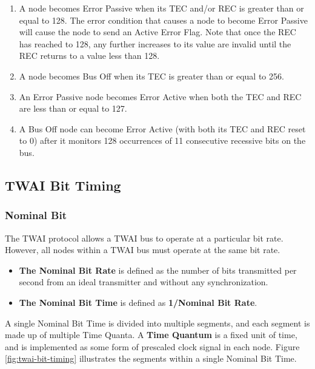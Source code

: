 \documentclass[main\_\_EN.tex]{subfiles}
\begin{document}
\begin{enumerate}
\begin{itemize}
        \item If the REC was between 1 and 127, the REC is decremented by 1.
        \item If the REC was greater than 127, the REC is set to 127.
        \item If the REC was 0, the REC remains 0.
    \end{itemize}
    \item A node becomes Error Passive when its TEC and/or REC is greater than or equal to 128. The error condition that causes a node to become Error Passive will cause the node to send an Active Error Flag. Note that once the REC has reached to 128, any further increases to its value are invalid until the REC returns to a value less than 128.
    \item A node becomes Bus Off when its TEC is greater than or equal to 256.
    \item An Error Passive node becomes Error Active when both the TEC and REC are less than or equal to 127.
    \item A Bus Off node can become Error Active (with both its TEC and REC reset to 0) after it monitors 128 occurrences of 11 consecutive recessive bits on the bus.
\end{enumerate}

\subsection{TWAI Bit Timing}
\subsubsection{Nominal Bit}

The TWAI protocol allows a TWAI bus to operate at a particular bit rate. However, all nodes within a TWAI bus must operate at the same bit rate.

\begin{itemize}
    \item \textbf{The Nominal Bit Rate} is defined as the number of bits transmitted per second from an ideal transmitter and without any synchronization.
    \item \textbf{The Nominal Bit Time} is defined as \textbf{1/Nominal Bit Rate}.
\end{itemize}

A single Nominal Bit Time is divided into multiple segments, and each segment is made up of multiple Time Quanta. A \textbf{Time Quantum} is a fixed unit of time, and is implemented as some form of prescaled clock signal in each node. Figure \ref{fig:twai-bit-timing} illustrates the segments within a single Nominal Bit Time.
\end{document}
